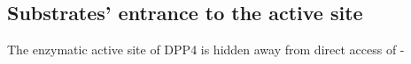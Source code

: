 \subsection{Substrates' entrance to the active site}

The enzymatic active site of DPP4 is hidden away from direct access of \beta-